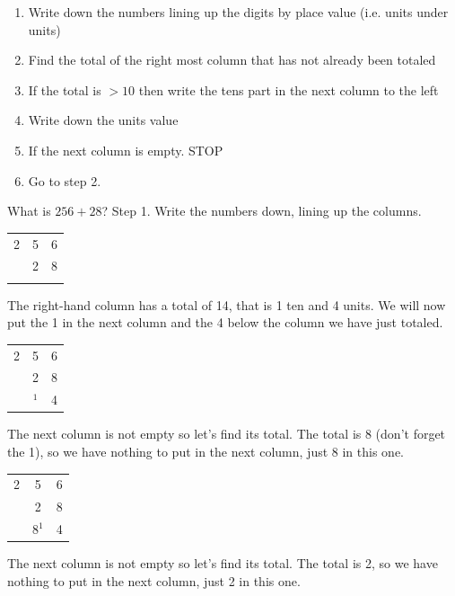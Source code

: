 \begin{enumerate}
	\item Write down the numbers lining up the digits by place value (i.e. units under units)
	\item Find the total of the right most column that has not already been totaled
	\item If the total is $> 10$ then write the tens part in the next column to the left
	\item Write down the units value
	\item If the next column is empty. STOP
	\item Go to step 2.
\end{enumerate}

\begin{exmp}
What is $256+28$?
Step 1. Write the numbers down, lining up the columns.

\renewcommand{\arraystretch}{1}
\begin{tabular}{c c c}
	2 & 5 & 6 \\
	  & 2 & 8 \\
	\hline \hline
	  &   &   \\
\end{tabular}

The right-hand column has a total of 14, that is 1 ten and 4 units.  We will now put the 1 in the next column and the 4 below the column we have just totaled.

\renewcommand{\arraystretch}{1}
\begin{tabular}{c c c}
	2 & 5 & 6 \\
	  & 2 & 8 \\
	\hline \hline
	  & $^1$  & 4 \\
\end{tabular}
\end{exmp}

The next column is not empty so let's find its total.
The total is 8 (don't forget the 1), so we have nothing to put in the next column, just 8 in this one.

\renewcommand{\arraystretch}{1}
\begin{tabular}{c c c}
	2 & 5 & 6 \\
	  & 2 & 8 \\
	\hline \hline
	  & $8^1$  & 4  \\
\end{tabular}

The next column is not empty so let's find its total.
The total is 2, so we have nothing to put in the next column, just 2 in this one.

